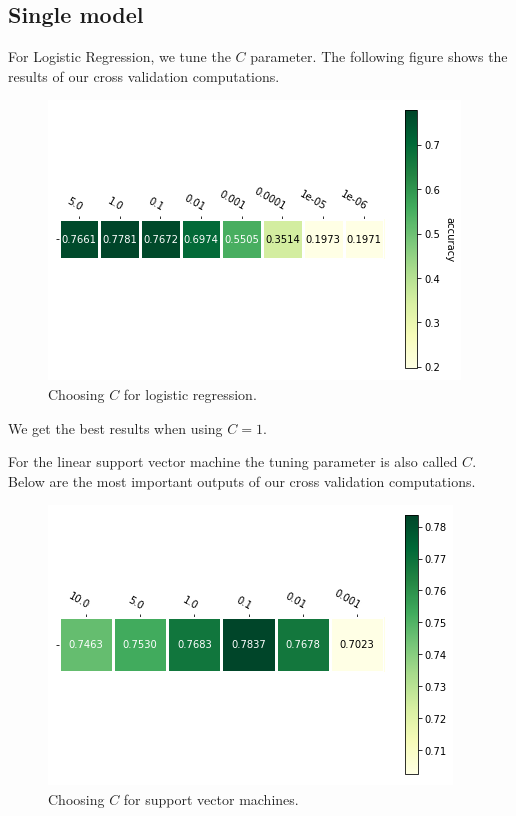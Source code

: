 \documentclass[parskip=half]{scrartcl}
\theoremstyle{definition}
\theoremstyle{remark}
\begin{document}
\subsection{Single model}

For Logistic Regression, we tune the $C$ parameter. 
The following figure shows the results of our cross validation computations. 

\begin{figure}[H]
\caption{Choosing $C$ for logistic regression.}
\centering
\includegraphics[scale=0.6]{images/logistic_params.png}
\end{figure}

We get the best results when using $C=1$.

For the linear support vector machine the tuning parameter is also called $C$. 
Below are the most important outputs of our cross validation computations. 

\begin{figure}[H]
\caption{Choosing $C$ for support vector machines.}
\centering
\includegraphics[scale=0.6]{images/linear_svm_params.png}
\end{figure}
\end{document}
